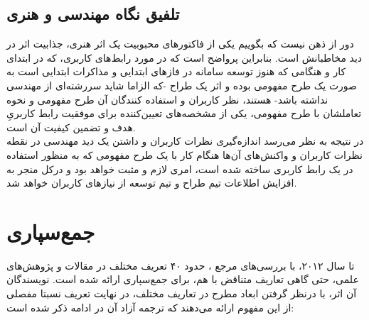\subsection{تلفیق نگاه مهندسی و هنری}
دور از ذهن نیست که بگوییم یکی از فاکتورهای محبوبیت یک اثر هنری، جذابیت اثر در دید مخاطبانش است. بنابراین پرواضح است که در مورد رابط‌های کاربری، که در ابتدای کار و هنگامی که هنوز توسعه سامانه در فازهای ابتدایی و مذاکرات ابتدایی است به صورت یک طرح مفهومی بوده و اثر یک طراح -که الزاما شاید سررشته‌ای از مهندسی نداشته باشد- هستند، نظر کاربران و استفاده کنندگان آن طرح مفهومی و نحوه تعاملشان با طرح مفهومی، یکی از مشخصه‌های تعیین‌کننده برای موفقیت رابط کاربریِ هدف و تضمین کیفیت آن است.\\
در نتیجه به نظر می‌رسد اندازه‌گیری نظرات کاربران و داشتن یک دید مهندسی در نقطه نظرات کاربران و واکنش‌های آن‌ها هنگام کار با یک طرح مفهومی که به منظور استفاده در یک رابط کاربری ساخته شده است، امری لازم و مثبت خواهد بود و درکل منجر به افزایش اطلاعات تیم طراح و تیم توسعه از نیازهای کاربران خواهد شد.
\section{جمع‌سپاری}
تا سال ۲۰۱۲، با بررسی‌های مرجع 
\cite{estelles-arolas_towards_2012}،
حدود ۴۰ تعریف مختلف در مقالات و پژوهش‌های علمی، حتی گاهی تعاریف متناقض با هم، برای جمع‌سپاری ارائه شده است. نویسندگان آن اثر، با درنظر گرفتن ابعاد مطرح در تعاریف مختلف، در نهایت تعریف نسبتا مفصلی از این مفهوم ارائه می‌دهند که ترجمه آزاد آن در ادامه ذکر شده است: 
